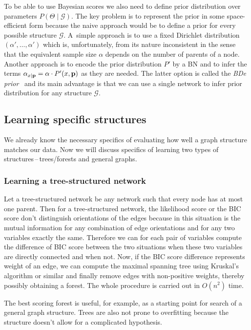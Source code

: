 \documentclass[english,cover]{fitthesis} %
\newcommand{\term}[1]{\emph{#1}}           %
\newcommand{\vars}[1]{{\bold{#1}}}         %
\begin{document}
\medskip

To be able to use Bayesian scores we also need to define prior distribution over parameters $P(\Theta \mid \mathcal{G})$. The key problem is to represent the prior in some space-efficient form because the naive approach would be to define a prior for every possible structure $\mathcal{G}$. A~simple approach is to use a fixed Dirichlet distribution $(\alpha',\dots,\alpha')$ which is, unfortunately, from its nature inconsistent in the sense that the equivalent sample size $\alpha$ depends on the number of parents of a node. Another approach is to encode the prior distribution $P'$ by a BN and to infer the terms $\alpha_{x \mid \vars{p}} = \alpha \cdot P'(x, \vars{p})$ as they are needed. The latter option is called the \term{BDe prior}~\cite[p.~806]{pgm} and its main advantage is that we can use a single network to infer prior distribution for any structure $\mathcal{G}$.



\subsection{Learning specific structures}
We already know the necessary specifics of evaluating how well a graph structure matches our data. Now we will discuss specifics of learning two types of structures\,--\,trees/forests and general graphs. 

\subsubsection{Learning a tree-structured network}
Let a tree-structured network be any network such that every node has at most one parent. Then for a tree-structured network, the likelihood score or the BIC score don't distinguish orientations of the edges because in this situation is the mutual information for any combination of edge orientations and for any two variables exactly the same. Therefore we can for each pair of variables compute the difference of BIC score between the two situations when these two variables are directly connected and when not. Now, if the BIC score difference represents weight of an edge, we can compute the maximal spanning tree using Kruskal's algorithm or similar and finally remove edges with non-positive weights, thereby possibly obtaining a forest. The whole procedure is carried out in $O(n^2)$ time.

The best scoring forest is useful, for example, as a starting point for search of a general graph structure. Trees are also not prone to overfitting because the structure doesn't allow for a complicated hypothesis.
\end{document}
